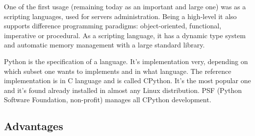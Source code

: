     One of the first usage (remaining today as an important and large one) was as a scripting languages, used for servers administration. Being a high-level it also supports difference programming paradigms: object-oriented, functional, imperative or procedural. As a scripting language, it has a dynamic type system and automatic memory management with a large standard library.
    
    Python is the specification of a language. It's implementation very, depending on which subset one wants to implements and in what language. The reference implementation is in C language and is called CPython. It's the most popular one and it's found already installed in almost any Linux distribution. PSF (Python Software Foundation, non-profit) manages all CPython development.
    
    \subsection{Advantages}
